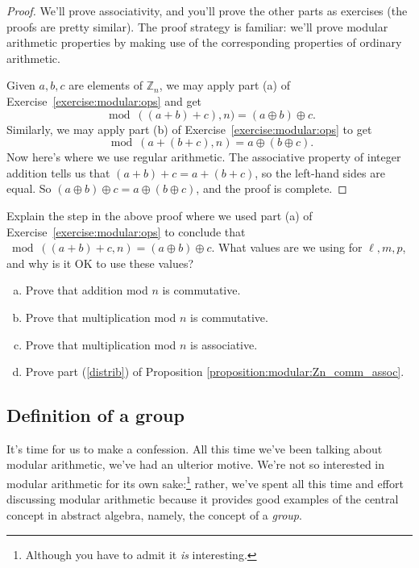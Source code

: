 \begin{proof}
We'll prove associativity, and  you'll prove the other parts as exercises (the proofs are pretty similar). The proof strategy is familiar: we'll prove modular arithmetic properties by making use of the corresponding properties of ordinary arithmetic.

Given $a,b,c$ are elements of $\mathbb{Z}_n$, 
we may apply part (a) of Exercise~\ref{exercise:modular:ops} and get
\[ \bmod((a + b) + c),n) =  (a \oplus b) \oplus c. \]
Similarly, we may apply part  (b) of Exercise~\ref{exercise:modular:ops} to get
\[ \bmod(a + (b + c),n) =  a \oplus (b \oplus c). \]
Now here's where we use regular arithmetic. The associative property of integer addition tells us that $(a+b)+c = a + (b + c) $, so the left-hand sides are equal. 
So $(a \oplus b) \oplus c = a \oplus (b \oplus c)$, and the proof is complete. 
\end{proof}
 
\begin{exercise}{}
Explain the step in the above proof where we used  part (a) of Exercise~\ref{exercise:modular:ops} to conclude that
$\bmod((a + b) + c,n) =  (a \oplus b) \oplus c$.  What values are we using for $\ell, m, p$, and why is it OK to use these values?
\end{exercise}

\begin{exercise}{}
\begin{enumerate}[(a)]
\item
Prove that addition mod $n$ is commutative.
\item
Prove that multiplication mod $n$ is commutative.
\item
Prove that multiplication mod $n$ is associative.
\item
Prove  part (\ref{distrib}) of Proposition \ref{proposition:modular:Zn_comm_assoc}.
\end{enumerate}
\end{exercise} 

\subsection{Definition of a group}\label{DefOfGroup}
It's time for us to make a confession. All this time we've been talking about modular arithmetic, we've had an ulterior motive. We're not so interested in modular arithmetic for its own sake:\footnote{Although you have to admit it \emph{is} interesting.} rather, we've spent all this time and effort discussing modular arithmetic because it provides good examples of the central concept in abstract algebra, namely, the concept of a \emph{group}.

